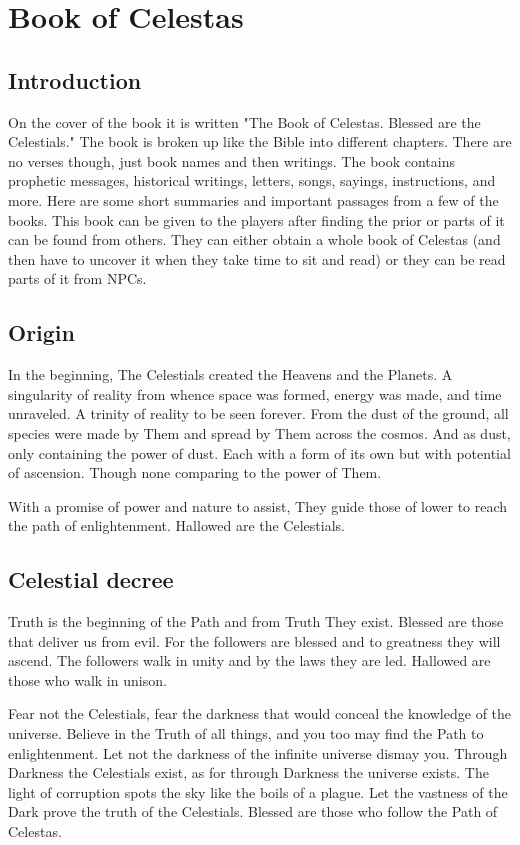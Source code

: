 \section{Book of Celestas}

\subsection{Introduction}

On the cover of the book it is written "The Book of Celestas. Blessed are the Celestials." The book is broken up like the Bible into different chapters. There are no verses though, just book names and then writings. The book contains prophetic messages, historical writings, letters, songs, sayings, instructions, and more. Here are some short summaries and important passages from a few of the books. This book can be given to the players after finding the prior or parts of it can be found from others. They can either obtain a whole book of Celestas (and then have to uncover it when they take time to sit and read) or they can be read parts of it from NPCs. 

\subsection{Origin}

In the beginning, The Celestials created the Heavens and the Planets. A singularity of reality from whence space was formed, energy was made, and time unraveled. A trinity of reality to be seen forever. From the dust of the ground, all species were made by Them and spread by Them across the cosmos. And as dust, only containing the power of dust. Each with a form of its own but with potential of ascension. Though none comparing to the power of Them.

With a promise of power and nature to assist, They guide those of lower to reach the path of enlightenment. Hallowed are the Celestials.

\subsection{Celestial decree}

Truth is the beginning of the Path and from Truth They exist. Blessed are those that deliver us from evil. For the followers are blessed and to greatness they will ascend. The followers walk in unity and by the laws they are led. Hallowed are those who walk in unison. 

Fear not the Celestials, fear the darkness that would conceal the knowledge of the universe. Believe in the Truth of all things, and you too may find the Path to enlightenment. Let not the darkness of the infinite universe dismay you. Through Darkness the Celestials exist, as for through Darkness the universe exists. The light of corruption spots the sky like the boils of a plague. Let the vastness of the Dark prove the truth of the Celestials. Blessed are those who follow the Path of Celestas. 

